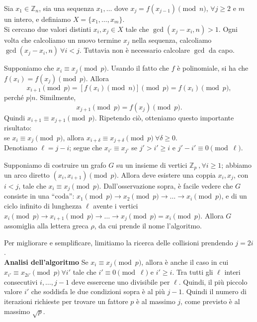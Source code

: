 \vspace{1em}\noindent
Sia $x_1 \in \mathbb{Z}_n$, sia una sequenza $x_1, \dots$ dove $x_j=f(x_{j-1}) \pmod n$, $\forall j \geq 2$ e $m$ un intero, e definiamo $X=\{x_1,\dots,x_m\}$. \\ Si cercano due valori distinti $x_i,x_j \in X$ tale che $\gcd(x_j-x_i, n)>1$. Ogni volta che calcoliamo un nuovo termine $x_j$ nella sequenza, calcoliamo $\gcd(x_j-x_i,n) \ \forall i<j$. Tuttavia non è necessario calcolare $\gcd$ da capo.

\vspace{0.2cm} \noindent Supponiamo che $x_i \equiv x_j \pmod p$. Usando il fatto che $f$ è polinomiale, si ha che $f(x_i)=f(x_j) \pmod p$. Allora 
\[
    x_{i+1} \pmod p = \left[ f(x_i)\pmod n \right] \pmod p = f(x_i) \pmod p,
\]
perché $p|n$. Similmente, 
\[
    x_{j+1} \pmod p=f(x_j) \pmod p.
\]
Quindi $x_{i+1} \equiv x_{j+1} \pmod p$. Ripetendo ciò, otteniamo questo importante risultato: \\ se $x_i \equiv x_j \pmod p$, allora $x_{i+\delta} \equiv x_{j+ \delta} \pmod p \ \forall \delta \geq 0$. \\ Denotiamo $\ell=j-i$; segue che $x_{i'} \equiv x_{j'}$ se $j'>i'\geq i$ e $j'-i' \equiv 0  \pmod \ell$. 

\vspace{1em}\noindent
Supponiamo di costruire un grafo $G$ su un insieme di vertici $\mathbb{Z}_p \ , \forall i \geq 1$; abbiamo un arco diretto $(x_i,x_{i+1}) \pmod p$. Allora deve esistere una coppia $x_i, x_j$, con $i<j$, tale che $x_i \equiv x_j \pmod p$. Dall'osservazione sopra, è facile vedere che $G$ consiste in una ``coda'': $x_1 \pmod p \to x_2 \pmod p \to \dots \to x_i \pmod p$, e di un ciclo infinito di lunghezza $\ell$ avente i vertici $x_i \pmod p \to x_{i+1} \pmod p \to \dots \to x_j \pmod p = x_i \pmod p$. Allora $G$ assomiglia alla lettera greca $\rho$, da cui prende il nome l'algoritmo. 



\vspace{0.2cm} \noindent Per migliorare e semplificare, limitiamo la ricerca delle collisioni prendendo $j=2i$. \\
\textbf{Analisi dell'algoritmo} Se $x_i \equiv x_j \pmod p$, allora è anche il caso in cui $x_{i'} \equiv x_{2i'} \pmod p \ \forall i'$ tale che $i' \equiv 0 \pmod \ell$ e $i' \geq i$. Tra tutti gli $\ell$ interi consecutivi $i,\dots, j-1$ deve essercene uno divisibile per $\ell$. Quindi, il più piccolo valore $i'$ che soddisfa le due condizioni sopra è al più $j-1$. Quindi il numero di iterazioni richieste per trovare un fattore $p$ è al massimo $j$, come previsto è al massimo $\sqrt{p}$. 

